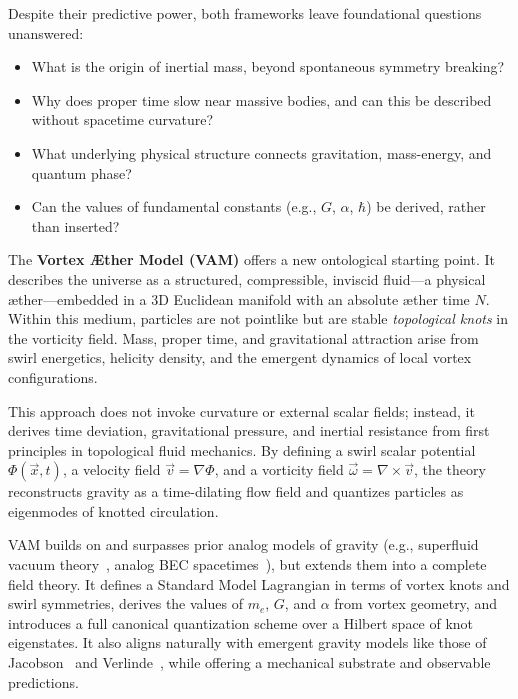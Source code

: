 \documentclass[12pt]{article}
\begin{document}
    Despite their predictive power, both frameworks leave foundational questions unanswered:
    \begin{itemize}
        \item What is the origin of inertial mass, beyond spontaneous symmetry breaking?
        \item Why does proper time slow near massive bodies, and can this be described without spacetime curvature?
        \item What underlying physical structure connects gravitation, mass-energy, and quantum phase?
        \item Can the values of fundamental constants (e.g., $G$, $\alpha$, $\hbar$) be derived, rather than inserted?
    \end{itemize}

    The \textbf{Vortex \AE ther Model (VAM)} offers a new ontological starting point. It describes the universe as a structured, compressible, inviscid fluid---a physical \ae ther---embedded in a 3D Euclidean manifold with an absolute æther time $N$. Within this medium, particles are not pointlike but are stable \textit{topological knots} in the vorticity field. Mass, proper time, and gravitational attraction arise from swirl energetics, helicity density, and the emergent dynamics of local vortex configurations.

    This approach does not invoke curvature or external scalar fields; instead, it derives time deviation, gravitational pressure, and inertial resistance from first principles in topological fluid mechanics. By defining a swirl scalar potential $\Phi(\vec{x},t)$, a velocity field $\vec{v} = \nabla \Phi$, and a vorticity field $\vec{\omega} = \nabla \times \vec{v}$, the theory reconstructs gravity as a time-dilating flow field and quantizes particles as eigenmodes of knotted circulation.

    VAM builds on and surpasses prior analog models of gravity (e.g., superfluid vacuum theory~\cite{barcelo2011analogue}, analog BEC spacetimes~\cite{volovik2003universe}), but extends them into a complete field theory. It defines a Standard Model Lagrangian in terms of vortex knots and swirl symmetries, derives the values of $m_e$, $G$, and $\alpha$ from vortex geometry, and introduces a full canonical quantization scheme over a Hilbert space of knot eigenstates. It also aligns naturally with emergent gravity models like those of Jacobson~\cite{jacobson1995thermo} and Verlinde~\cite{verlinde2011emergent}, while offering a mechanical substrate and observable predictions.
\end{document}
